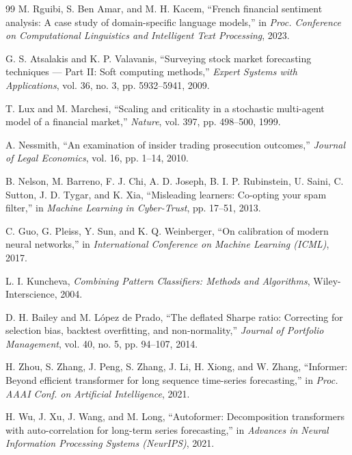 \documentclass[conference]{IEEEtran}
\begin{document}
\begin{thebibliography}{99}
M. Rguibi, S. Ben Amar, and M. H. Kacem, ``French financial sentiment analysis: A case study of domain-specific language models,'' in \textit{Proc. Conference on Computational Linguistics and Intelligent Text Processing}, 2023.

G. S. Atsalakis and K. P. Valavanis, ``Surveying stock market forecasting techniques --- Part II: Soft computing methods,'' \textit{Expert Systems with Applications}, vol. 36, no. 3, pp. 5932--5941, 2009.

T. Lux and M. Marchesi, ``Scaling and criticality in a stochastic multi-agent model of a financial market,'' \textit{Nature}, vol. 397, pp. 498--500, 1999.

A. Nessmith, ``An examination of insider trading prosecution outcomes,'' \textit{Journal of Legal Economics}, vol. 16, pp. 1--14, 2010.

B. Nelson, M. Barreno, F. J. Chi, A. D. Joseph, B. I. P. Rubinstein, U. Saini, C. Sutton, J. D. Tygar, and K. Xia, ``Misleading learners: Co-opting your spam filter,'' in \textit{Machine Learning in Cyber-Trust}, pp. 17--51, 2013.

C. Guo, G. Pleiss, Y. Sun, and K. Q. Weinberger, ``On calibration of modern neural networks,'' in \textit{International Conference on Machine Learning (ICML)}, 2017.

L. I. Kuncheva, \textit{Combining Pattern Classifiers: Methods and Algorithms}, Wiley-Interscience, 2004.

D. H. Bailey and M. L\'{o}pez de Prado, ``The deflated Sharpe ratio: Correcting for selection bias, backtest overfitting, and non-normality,'' \textit{Journal of Portfolio Management}, vol. 40, no. 5, pp. 94--107, 2014.


H. Zhou, S. Zhang, J. Peng, S. Zhang, J. Li, H. Xiong, and W. Zhang, ``Informer: Beyond efficient transformer for long sequence time-series forecasting,'' in \textit{Proc. AAAI Conf. on Artificial Intelligence}, 2021.

H. Wu, J. Xu, J. Wang, and M. Long, ``Autoformer: Decomposition transformers with auto-correlation for long-term series forecasting,'' in \textit{Advances in Neural Information Processing Systems (NeurIPS)}, 2021.


\end{thebibliography}
\end{document}
